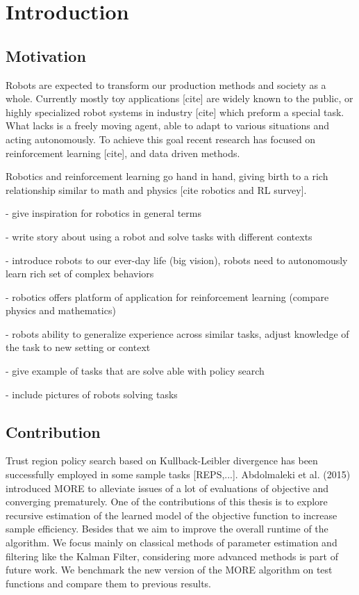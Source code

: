 
\chapter{Introduction}

\section{Motivation}
Robots are expected to transform our production methods and society as a whole.
Currently mostly toy applications [cite] are widely known to the public, or highly
specialized robot systems  in industry [cite]  which preform a special task. What lacks
is a freely moving agent, able to adapt to various situations and acting
autonomously.
To achieve this goal recent research has focused on reinforcement learning [cite],
and data driven methods.

Robotics and reinforcement learning go hand in hand, giving birth to a rich
relationship similar to math and physics [cite robotics and RL survey].

- give inspiration for robotics in general terms

- write story about using a robot and solve tasks with different contexts

- introduce robots to our ever-day life (big vision), robots need to
autonomously learn rich set of complex behaviors

- robotics offers platform of application for reinforcement learning
(compare physics and mathematics)

- robots ability to generalize experience across similar tasks,
  adjust knowledge of the task to new setting or context

- give example of tasks that are solve able with policy search

- include pictures of robots solving tasks


\section{Contribution}
Trust region policy search based on Kullback-Leibler divergence has been
successfully employed in some sample tasks [REPS,...]. 
Abdolmaleki et al. (2015) introduced MORE to alleviate issues of a lot
of evaluations of objective and converging prematurely. One of
the contributions of this thesis is to explore recursive estimation 
of the learned model of the objective function to increase
sample efficiency. Besides that we aim to improve the overall runtime of
the algorithm. We focus mainly on classical methods of parameter estimation and filtering
like the Kalman Filter, considering more advanced methods is part of future work.
We benchmark the new version of the MORE algorithm on test functions and compare
them to previous results.

